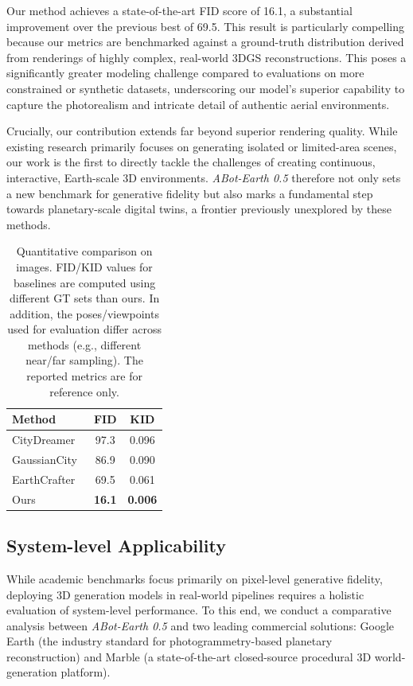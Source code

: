 \documentclass{llmxive}
\providecommand{\method}{\textit{ABot-Earth 0.5}\xspace}
\begin{document}
Our method achieves a state-of-the-art FID score of 16.1, a substantial improvement over the previous best of 69.5. This result is particularly compelling because our metrics are benchmarked against a ground-truth distribution derived from renderings of highly complex, real-world 3DGS reconstructions. This poses a significantly greater modeling challenge compared to evaluations on more constrained or synthetic datasets, underscoring our model's superior capability to capture the photorealism and intricate detail of authentic aerial environments.

Crucially, our contribution extends far beyond superior rendering quality. While existing research primarily focuses on generating isolated or limited-area scenes, our work is the first to directly tackle the challenges of creating continuous, interactive, Earth-scale 3D environments. \method{} therefore not only sets a new benchmark for generative fidelity but also marks a fundamental step towards planetary-scale digital twins, a frontier previously unexplored by these methods.


\begin{table}[!htbp]
\centering
\small
\setlength{\tabcolsep}{10pt}
\begin{tabular}{lcc}
\toprule
\textbf{Method} & \textbf{FID} & \textbf{KID} \\
\midrule
CityDreamer~\cite{CityDreamer} & 97.3 & 0.096 \\
GaussianCity~\cite{Xie_2025_CVPR} & 86.9 & 0.090 \\
EarthCrafter~\cite{earthcrafter} & 69.5 & 0.061 \\
\hline
Ours &\textbf{16.1}&\textbf{0.006}\\
\bottomrule
\end{tabular}
\label{tab:conditions_results}
\caption{Quantitative comparison on images. FID/KID values for baselines are computed using different GT sets than ours. In addition, the poses/viewpoints used for evaluation differ across methods (e.g., different near/far sampling). The reported metrics are for reference only.}
\end{table}


\subsection{System-level Applicability}
\label{sec:system_applicability}

While academic benchmarks focus primarily on pixel-level generative fidelity, deploying 3D generation models in real-world pipelines requires a holistic evaluation of system-level performance. To this end, we conduct a comparative analysis between \method{} and two leading commercial solutions: Google Earth (the industry standard for photogrammetry-based planetary reconstruction) and Marble (a state-of-the-art closed-source procedural 3D world-generation platform).
\end{document}
